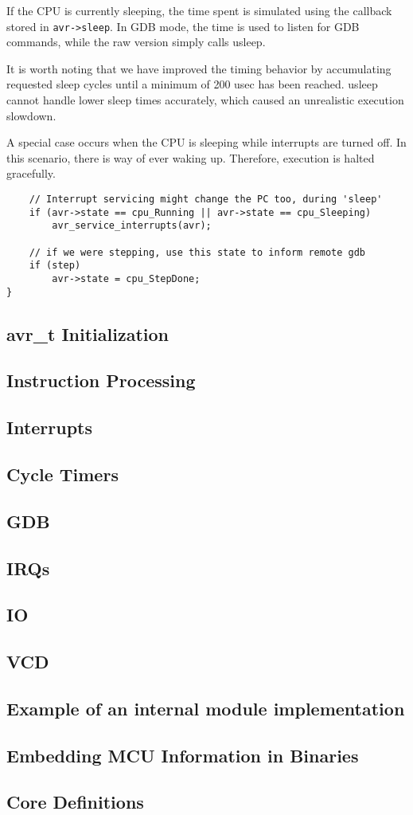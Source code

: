 If the CPU is currently sleeping, the time spent is simulated using the callback
stored in \lstinline|avr->sleep|. In GDB mode, the time is used to listen for
GDB commands, while the raw version simply calls usleep.

It is worth noting that
we have improved the timing behavior by accumulating requested sleep cycles until
a minimum of 200 usec has been reached. usleep cannot handle lower sleep times
accurately, which caused an unrealistic execution slowdown.

A special case occurs when the CPU is sleeping while interrupts are turned off.
In this scenario, there is way of ever waking up. Therefore, execution is halted
gracefully.

\begin{lstlisting}
    // Interrupt servicing might change the PC too, during 'sleep'
    if (avr->state == cpu_Running || avr->state == cpu_Sleeping)
        avr_service_interrupts(avr);

    // if we were stepping, use this state to inform remote gdb
    if (step)
        avr->state = cpu_StepDone;
}
\end{lstlisting}



\subsection{avr\_t Initialization}
\subsection{Instruction Processing}
\subsection{Interrupts}
\subsection{Cycle Timers}
\subsection{GDB}
\subsection{IRQs}
\subsection{IO}
\subsection{VCD}
\subsection{Example of an internal module implementation} %
\subsection{Embedding MCU Information in Binaries}
\subsection{Core Definitions}


